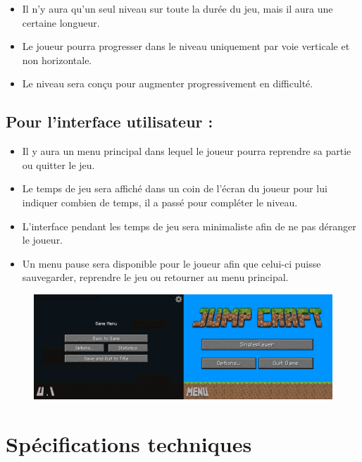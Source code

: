 \documentclass{report}
\begin{document}
\begin{itemize}[label={\textbf{--}}]
    \item Il n’y aura qu’un seul niveau sur toute la durée du jeu, mais il aura une certaine longueur.
    \item Le joueur pourra progresser dans le niveau uniquement par voie verticale et non horizontale.
    \item Le niveau sera conçu pour augmenter progressivement en difficulté.
\end{itemize}

\subsection{Pour l’interface utilisateur :}

\begin{itemize}[label={\textbf{--}}]
    \item Il y aura un menu principal dans lequel le joueur pourra reprendre sa partie ou quitter le jeu.
    \item Le temps de jeu sera affiché dans un coin de l’écran du joueur pour lui indiquer combien de temps, il a passé pour compléter le niveau.
    \item L’interface pendant les temps de jeu sera minimaliste afin de ne pas déranger le joueur.
    \item Un menu pause sera disponible pour le joueur afin que celui-ci puisse sauvegarder, reprendre le jeu ou retourner au menu principal.
\end{itemize}

\begin{figure}
    \centering
    \includegraphics[width=1\linewidth]{UI_&_Menu.png}
    
\end{figure}

\vspace{1cm}

\section{Spécifications techniques}
\end{document}
